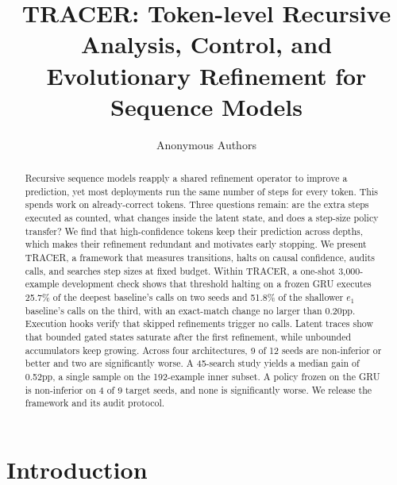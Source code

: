 \documentclass[11pt]{article}
\title{TRACER: Token-level Recursive Analysis, Control, and Evolutionary Refinement for Sequence Models}
\author{Anonymous Authors}
\begin{document}
\maketitle

\begin{abstract}
Recursive sequence models reapply a shared refinement operator to improve a prediction, yet most deployments run the same number of steps for every token. This spends work on already-correct tokens. Three questions remain: are the extra steps executed as counted, what changes inside the latent state, and does a step-size policy transfer? We find that high-confidence tokens keep their prediction across depths, which makes their refinement redundant and motivates early stopping. We present TRACER, a framework that measures transitions, halts on causal confidence, audits calls, and searches step sizes at fixed budget. Within TRACER, a one-shot 3{,}000-example development check shows that threshold halting on a frozen GRU executes 25.7\% of the deepest baseline's calls on two seeds and 51.8\% of the shallower $e_1$ baseline's calls on the third, with an exact-match change no larger than 0.20pp. Execution hooks verify that skipped refinements trigger no calls. Latent traces show that bounded gated states saturate after the first refinement, while unbounded accumulators keep growing. Across four architectures, 9 of 12 seeds are non-inferior or better and two are significantly worse. A 45-search study yields a median gain of 0.52pp, a single sample on the 192-example inner subset. A policy frozen on the GRU is non-inferior on 4 of 9 target seeds, and none is significantly worse. We release the framework and its audit protocol.
\end{abstract}

\section{Introduction}
\label{sec:intro}
\end{document}
